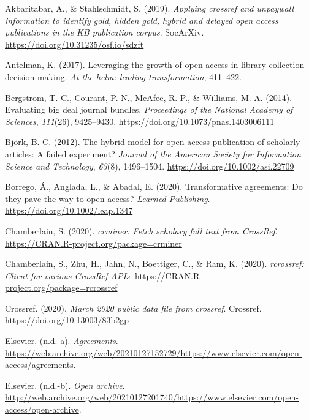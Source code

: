 \documentclass[a4paper,man,floatsintext,longtable,noextraspace,12pt]{apa6}
\newlength{\cslhangindent}
\newenvironment{cslreferences}%
  {\setlength{\parindent}{0pt}%
  \everypar{\setlength{\hangindent}{\cslhangindent}}\ignorespaces}%
  {\par}
\begin{document}
\hypertarget{refs}{}
\begin{cslreferences}
\leavevmode\hypertarget{ref-Akbaritabar_2019}{}%
Akbaritabar, A., \& Stahlschmidt, S. (2019). \emph{Applying crossref and
unpaywall information to identify gold, hidden gold, hybrid and delayed
open access publications in the KB publication corpus}. SocArXiv.
\url{https://doi.org/10.31235/osf.io/sdzft}

\leavevmode\hypertarget{ref-antelmann_2017}{}%
Antelman, K. (2017). Leveraging the growth of open access in library
collection decision making. \emph{At the helm: leading transformation},
411--422.

\leavevmode\hypertarget{ref-Bergstrom_2014}{}%
Bergstrom, T. C., Courant, P. N., McAfee, R. P., \& Williams, M. A.
(2014). Evaluating big deal journal bundles. \emph{Proceedings of the
National Academy of Sciences}, \emph{111}(26), 9425--9430.
\url{https://doi.org/10.1073/pnas.1403006111}

\leavevmode\hypertarget{ref-Bj_rk_2012}{}%
Björk, B.-C. (2012). The hybrid model for open access publication of
scholarly articles: A failed experiment? \emph{Journal of the American
Society for Information Science and Technology}, \emph{63}(8),
1496--1504. \url{https://doi.org/10.1002/asi.22709}

\leavevmode\hypertarget{ref-Borrego_2020}{}%
Borrego, Á., Anglada, L., \& Abadal, E. (2020). Transformative
agreements: Do they pave the way to open access? \emph{Learned
Publishing}. \url{https://doi.org/10.1002/leap.1347}

\leavevmode\hypertarget{ref-crminer}{}%
Chamberlain, S. (2020). \emph{crminer: Fetch scholary full text from
CrossRef}. \url{https://CRAN.R-project.org/package=crminer}

\leavevmode\hypertarget{ref-rcrossref}{}%
Chamberlain, S., Zhu, H., Jahn, N., Boettiger, C., \& Ram, K. (2020).
\emph{rcrossref: Client for various CrossRef APIs}.
\url{https://CRAN.R-project.org/package=rcrossref}

\leavevmode\hypertarget{ref-Crossref_2020}{}%
Crossref. (2020). \emph{March 2020 public data file from crossref}.
Crossref. \url{https://doi.org/10.13003/83b2gp}

\leavevmode\hypertarget{ref-Els_Agreements}{}%
Elsevier. (n.d.-a). \emph{Agreements}.
\url{https://web.archive.org/web/20210127152729/https://www.elsevier.com/open-access/agreements}.

\leavevmode\hypertarget{ref-Els_Archive}{}%
Elsevier. (n.d.-b). \emph{Open archive}.
\url{http://web.archive.org/web/20210127201740/https://www.elsevier.com/open-access/open-archive}.


\end{cslreferences}
\end{document}
